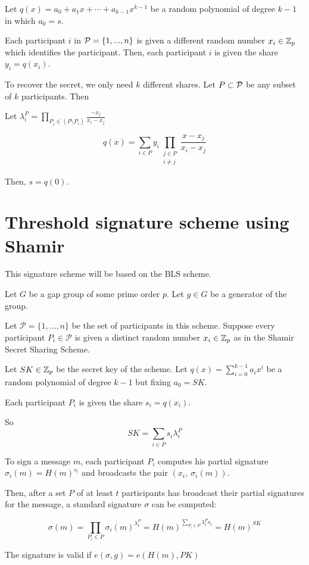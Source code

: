 Let $q(x) = a_0 + a_1 x + \cdots + a_{k-1} x^{k-1}$ be a random polynomial of degree $k-1$ in which $a_0 = s$.

Each participant $i$ in ${\mathcal P} = \{ 1, ... , n \}$ is given a different random number $x_i \in {\mathbb Z}_p$ which identifies the participant.
Then, each participant $i$ is given the share $y_i = q(x_i)$.

To recover the secret, we only need $k$ different shares. Let $P \subset {\mathcal P}$ be any subset of $k$ participants. Then

Let $\lambda_i^{P} = \prod_{P_j \in (P \setminus P_i)} \frac{-x_j}{x_i - x_j}$

$$
    q(x) = \sum_{i \in P} y_i \prod_{\substack{j \in P \\ i \neq j}} \frac{x-x_j}{x_i-x_j}
$$

Then, $s = q(0)$.

\section{Threshold signature scheme using Shamir}
\label{sec:shamir_sig}

This signature scheme will be based on the BLS scheme.

Let $G$ be a gap group of some prime order $p$. Let $g \in G$ be a generator of the group.

Let $\mathcal{P}= \{ 1, \dots , n \}$ be the set of participants in this scheme. Suppose every participant $P_i \in \mathcal{P}$ is given a distinct random number $x_i \in {\mathbb Z}_p$ as in the Shamir Secret Sharing Scheme.

Let $SK \in {\mathbb Z}_p$ be the secret key of the scheme. Let $q(x) = \sum_{i=0}^{k-1} a_i x^i$ be a random polynomial of degree $k-1$ but fixing $a_0 = SK$.

Each participant $P_i$ is given the share $s_i = q(x_i)$.

So $$SK = \sum_{i \in P} s_i \lambda_i^P$$

To sign a message $m$, each participant $P_i$ computes his partial signature $\sigma_i (m) = H(m)^{s_i}$ and broadcasts the pair $(x_i, \ \sigma_i (m))$.

Then, after a set $P$ of at least $t$ participants has broadcast their partial signatures for the message, a standard signature $\sigma$ can be computed:

$$ \sigma (m) = \prod_{P_i \in P} \sigma_i (m)^{\lambda_i^{P}}= H(m)^{\sum_{P_i \in P} \lambda_i^P s_i} = H(m)^{SK}$$

The signature is valid if $e(\sigma, g) = e(H(m), PK)$

